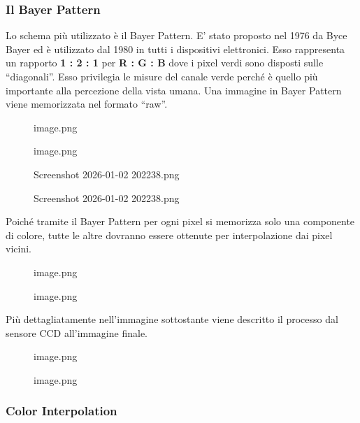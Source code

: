 \documentclass[
]{article}
\begin{document}
\hypertarget{il-bayer-pattern}{%
\subsubsection{Il Bayer Pattern}\label{il-bayer-pattern}}

Lo schema più utilizzato è il Bayer Pattern. E' stato proposto nel 1976 da Byce Bayer ed è utilizzato dal 1980 in tutti i dispositivi elettronici.
Esso rappresenta un rapporto \textbf{1 : 2 : 1} per \textbf{R : G : B} dove i pixel verdi sono disposti sulle ``diagonali''.
Esso privilegia le misure del canale verde perché è quello più importante alla percezione della vista umana.
Una immagine in Bayer Pattern viene memorizzata nel formato ``raw''.

\begin{figure}
\centering
{image.png}
\caption{image.png}
\end{figure}

\begin{figure}
\centering
{Screenshot 2026-01-02 202238.png}
\caption{Screenshot 2026-01-02 202238.png}
\end{figure}

Poiché tramite il Bayer Pattern per ogni pixel si memorizza solo una componente di colore, tutte le altre dovranno essere ottenute per interpolazione dai pixel vicini.

\begin{figure}
\centering
{image.png}
\caption{image.png}
\end{figure}

Più dettagliatamente nell'immagine sottostante viene descritto il processo dal sensore CCD all'immagine finale.

\begin{figure}
\centering
{image.png}
\caption{image.png}
\end{figure}

\hypertarget{color-interpolation}{%
\subsubsection{Color Interpolation}\label{color-interpolation}}
\end{document}

